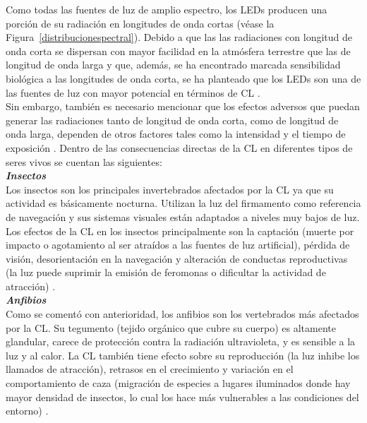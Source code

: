 Como todas las fuentes de luz de amplio espectro, los LEDs producen una porción de su radiación en longitudes de onda cortas (véase la Figura~\ref{distribucionespectral}). Debido a que las las radiaciones con longitud de onda corta se dispersan con mayor facilidad en la atmósfera terrestre que las de longitud de onda larga y que, además, se ha encontrado marcada sensibilidad biológica a las longitudes de onda corta, se ha planteado que los LEDs son una de las fuentes de luz con mayor potencial en términos de CL \citep{USENERGY2017}.\\

Sin embargo, también es necesario mencionar que los efectos adversos que puedan generar las radiaciones tanto de longitud de onda corta, como de longitud de onda larga, dependen de otros factores tales como la intensidad y el tiempo de exposición \citep{Globaldiscussion}. Dentro de las consecuencias directas de la CL en diferentes tipos de seres vivos se cuentan las siguientes:\\


\textit{\textbf{Insectos}}\\

Los insectos son los principales invertebrados afectados por la CL ya que su actividad es básicamente nocturna. Utilizan  la luz del firmamento como referencia de navegación y sus sistemas visuales están adaptados a niveles muy bajos de luz. Los efectos de la CL en los insectos principalmente son la captación (muerte por impacto o agotamiento al ser atraídos a las fuentes de luz artificial), pérdida de visión, desorientación en la navegación y alteración de conductas reproductivas (la luz puede suprimir la emisión de feromonas o dificultar la actividad de atracción) \citep{CEI2017,Davies2013}.\\

\textit{\textbf{Anfibios}}\\

Como se comentó con anterioridad, los anfibios son los vertebrados más afectados por la CL. Su tegumento (tejido orgánico que cubre su cuerpo) es altamente glandular, carece de protección contra la radiación ultravioleta, y es sensible a la luz y al calor. La CL también tiene efecto sobre su reproducción (la luz inhibe los llamados de atracción), retrasos en el crecimiento y variación en el comportamiento de caza (migración de especies a lugares iluminados donde hay mayor densidad de insectos, lo cual los hace más vulnerables a las condiciones del entorno) \citep{Longcore2006,LibroCL}.\\

